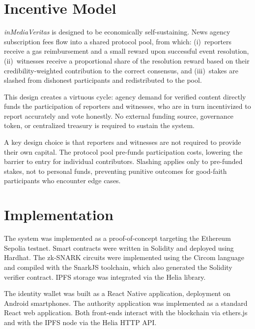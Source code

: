 \documentclass[11pt]{article}
\begin{document}
\section{Incentive Model}

\textit{inMediaVeritas} is designed to be economically self-sustaining. News
agency subscription fees flow into a shared protocol pool, from which:
(i)~reporters receive a gas reimbursement and a small reward upon successful
event resolution, (ii)~witnesses receive a proportional share of the resolution
reward based on their credibility-weighted contribution to the correct consensus,
and (iii)~stakes are slashed from dishonest participants and redistributed to
the pool.

This design creates a virtuous cycle: agency demand for verified content
directly funds the participation of reporters and witnesses, who are in turn
incentivized to report accurately and vote honestly. No external funding source,
governance token, or centralized treasury is required to sustain the system.

A key design choice is that reporters and witnesses are not required to provide
their own capital. The protocol pool pre-funds participation costs, lowering
the barrier to entry for individual contributors. Slashing applies only to
pre-funded stakes, not to personal funds, preventing punitive outcomes for
good-faith participants who encounter edge cases.

\section{Implementation}

The system was implemented as a proof-of-concept targeting the Ethereum Sepolia
testnet. Smart contracts were written in Solidity and deployed using Hardhat.
The zk-SNARK circuits were implemented using the Circom language and compiled
with the SnarkJS toolchain, which also generated the Solidity verifier contract.
IPFS storage was integrated via the Helia library.

The identity wallet was built as a React Native application,
deployment on Android smartphones. The authority application was implemented as a
standard React web application. Both front-ends interact with the blockchain
via ethers.js and with the IPFS node via the Helia HTTP API.


\end{document}
